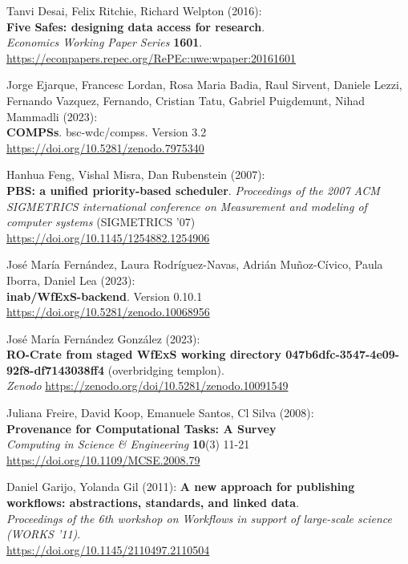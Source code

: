 \documentclass[10pt,letterpaper]{article}
\begin{document}
\begin{thebibliography}{10}
\begin{small}
Tanvi Desai, Felix Ritchie, Richard Welpton (2016):\\
\textbf{Five Safes: designing data access for research}.\\
\emph{Economics Working Paper Series} \textbf{1601}.\\
\url{https://econpapers.repec.org/RePEc:uwe:wpaper:20161601}

Jorge Ejarque, Francesc Lordan, Rosa Maria Badia, Raul Sirvent, Daniele Lezzi, Fernando Vazquez, Fernando, Cristian Tatu,  Gabriel Puigdemunt, Nihad Mammadli (2023):\\
\textbf{COMPSs}. bsc-wdc/compss. Version 3.2\\
\url{https://doi.org/10.5281/zenodo.7975340}

Hanhua Feng, Vishal Misra, Dan Rubenstein (2007):\\
\textbf{PBS: a unified priority-based scheduler}.
\emph{Proceedings of the 2007 ACM SIGMETRICS international conference on Measurement and modeling of computer systems} (SIGMETRICS '07)\\
\url{https://doi.org/10.1145/1254882.1254906} 

José María Fernández, Laura Rodríguez-Navas, Adrián Muñoz-Cívico, Paula Iborra, Daniel Lea (2023):\\
\textbf{inab/WfExS-backend}. Version 0.10.1\\
\url{https://doi.org/10.5281/zenodo.10068956}

José María Fernández González (2023):\\
\textbf{RO-Crate from staged WfExS working directory 047b6dfc-3547-4e09-92f8-df7143038ff4} (overbridging templon).\\
\emph{Zenodo}
\url{https://zenodo.org/doi/10.5281/zenodo.10091549}

Juliana Freire, David Koop, Emanuele Santos, Cl Silva (2008):\\
\textbf{Provenance for Computational Tasks: A Survey}\\
\emph{Computing in Science \& Engineering} \textbf{10}(3) 11-21\\
\url{https://doi.org/10.1109/MCSE.2008.79}

Daniel Garijo, Yolanda Gil (2011):
\textbf{A new approach for publishing workflows: abstractions, standards, and linked data}.\\
\emph{Proceedings of the 6th workshop on Workflows in support of large-scale science (WORKS '11)}.\\
\url{https://doi.org/10.1145/2110497.2110504}


\end{small}
\end{thebibliography}
\end{document}
